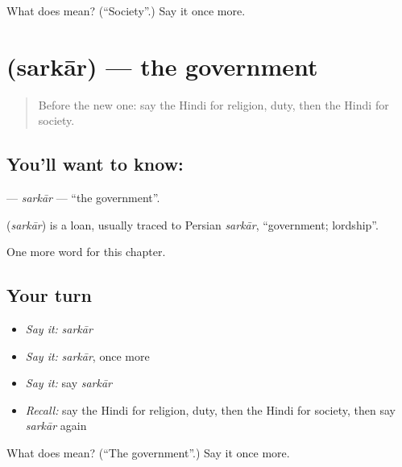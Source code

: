 \begin{tcolorbox}[breakable,colback=teal!4,colframe=teal!35!black,title={Before you move on}]
What does  mean? (\textquotedblleft{}Society\textquotedblright{}.) Say it once more.
\end{tcolorbox}
\section[\texorpdfstring{\hi{सरकार} (sarkār)}{सरकार (sarkār)}]{ (sarkār) — the government}

\label{lesson:HI-C218-sarkar}



\begin{quote}
Before the new one: say the Hindi for religion, duty, then the Hindi for society.
\end{quote}

\subsection*{You'll want to know: }
\textbf{} — \emph{sarkār} — \textquotedblleft{}the government\textquotedblright{}.

\begin{cousinweb}
\textbf{} (\emph{sarkār}) is a loan, usually traced to Persian \emph{sarkār}, \textquotedblleft{}government; lordship\textquotedblright{}.
\end{cousinweb}

\begin{grammarlens}[title={What you've built}]
One more word for this chapter.
\end{grammarlens}

\subsection*{Your turn}
\begin{itemize}
\raggedright
  \item \emph{Say it:} \emph{sarkār}
  \item \emph{Say it:} \emph{sarkār}, once more
  \item \emph{Say it:} say \emph{sarkār}
  \item \emph{Recall:} say the Hindi for religion, duty, then the Hindi for society, then say \emph{sarkār} again
\end{itemize}

\begin{tcolorbox}[breakable,colback=teal!4,colframe=teal!35!black,title={Before you move on}]
What does  mean? (\textquotedblleft{}The government\textquotedblright{}.) Say it once more.
\end{tcolorbox}

